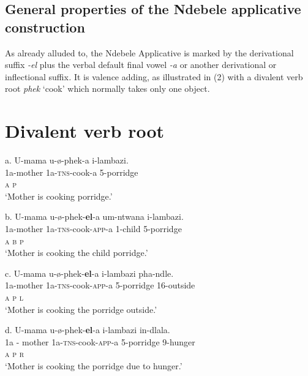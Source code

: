 \section{ General properties of the Ndebele applicative construction}

As already alluded to, the Ndebele Applicative is marked by the derivational suffix \textit{{}-el }plus the verbal default final vowel \textit{{}-a} or another derivational or inflectional suffix\textit{.} It is valence adding, as illustrated in (2) with a divalent verb root \textit{phek} ‘cook’ which normally takes only one object. 

\chapter[Divalent verb root ]{Divalent verb root\textbf{ }}
\gll   a.  U-mama         u-ø-phek-a             i-lambazi.\\
     \textit{    }1a-mother      1a-\textsc{tns}{}-cook-a      5-porridge\\
         \textsc{a                  p}\\
\glt     ‘Mother is cooking porridge.’
\z

\gll   b.   U-mama        u-ø-phek-\textbf{el}{}-a          um-ntwana  i-lambazi. \\
     \textit{    }1a-mother      1a-\textsc{tns}{}-cook-\textsc{app}{}-a  1-child      5-porridge\\
     \textit{    }\textsc{a                  b        p}\\
\glt     ‘Mother is cooking the child porridge.’
\z

\gll   c.  U-mama      u-ø-phek-\textbf{el}{}-a              i-lambazi        pha-ndle.\\
         1a-mother   1a-\textsc{tns}{}-cook-\textsc{app}{}-a    5-porridge       16-outside\\
         \textsc{a                    p        l}\\
\glt     ‘Mother is cooking the porridge outside.’
\z

\gll   d.  U-mama          u-ø-phek-\textbf{el}{}-a               i-lambazi    in-dlala.\\
         1a - mother     1a-\textsc{tns}{}-cook-\textsc{app}{}-a     5-porridge    9-hunger\\
         \textsc{a                    p        r}\\
\glt     ‘Mother is cooking the porridge due to hunger.’
\z

